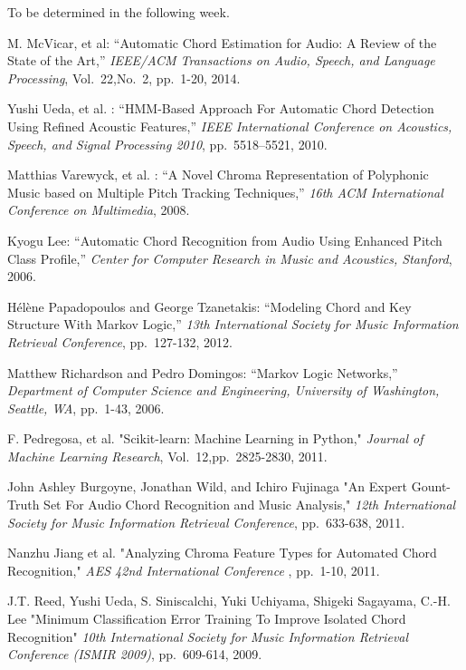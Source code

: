 \documentclass{article}
\begin{document}
To be determined in the following week.


\begin{thebibliography}{citations}

M. McVicar, et al:
``Automatic Chord Estimation for Audio: A Review of the State of the Art,''
{\it IEEE/ACM Transactions on Audio, Speech, and Language Processing},
Vol.~22,No.~2, pp.~1-20, 2014.

Yushi Ueda, et al. :
``HMM-Based Approach For Automatic Chord Detection Using Refined Acoustic
Features,''
{\it IEEE International Conference on Acoustics, Speech, and Signal
Processing 2010},
pp.~5518--5521, 2010.

Matthias Varewyck, et al. :
``A Novel Chroma Representation of Polyphonic Music based on Multiple Pitch
Tracking Techniques,''
{\it 16th ACM International Conference on Multimedia},
2008.

Kyogu Lee:
``Automatic Chord Recognition from Audio Using Enhanced Pitch Class Profile,''
{\it Center for Computer Research in Music and Acoustics, Stanford},
2006.

Hélène Papadopoulos and George Tzanetakis:
``Modeling Chord and Key Structure With Markov Logic,''
{\it 13th International Society for Music Information Retrieval Conference},
pp.~127-132, 2012.

Matthew Richardson and Pedro Domingos:
``Markov Logic Networks,''
{\it Department of Computer Science and Engineering, University of Washington,
Seattle, WA},
pp.~1-43, 2006.

F. Pedregosa, et al.
"Scikit-learn: Machine Learning in Python,"
{\it Journal of Machine Learning Research},
Vol.~12,pp.~2825-2830, 2011.

John Ashley Burgoyne, Jonathan Wild, and Ichiro Fujinaga
"An Expert Gount-Truth Set For Audio Chord Recognition and Music Analysis,"
{\it 12th International Society for Music Information Retrieval Conference},
pp.~633-638, 2011.

Nanzhu Jiang et al.
"Analyzing Chroma Feature Types for Automated Chord Recognition,"
{\it AES 42nd International Conference },
pp.~1-10, 2011.

J.T. Reed, Yushi Ueda, S. Siniscalchi, Yuki Uchiyama, Shigeki Sagayama, C.-H. Lee
"Minimum Classification Error Training To Improve Isolated Chord Recognition"
{\it 10th International Society for Music Information Retrieval Conference (ISMIR 2009)},
pp.~609-614, 2009.


\end{thebibliography}
\end{document}
